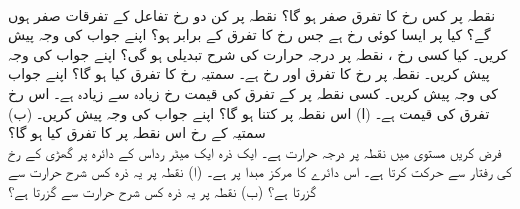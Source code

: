 \\
نقطہ  پر کس رخ  کا تفرق صفر ہو گا؟
نقطہ  پر کن دو رخ تفاعل  کے تفرقات  صفر ہوں گے؟
کیا  پر ایسا کوئی  رخ  ہے جس رخ   کا تفرق  کے برابر ہو؟ اپنے جواب کی وجہ پیش کریں۔
کیا کسی رخ ،  نقطہ  پر  درجہ حرارت     کی شرح تبدیلی  ہو گی؟ اپنے جواب کی وجہ پیش کریں۔
نقطہ  پر  رخ   کا تفرق   اور  رخ  ہے۔   سمتیہ   رخ  کا تفرق کیا ہو گا؟ اپنے جواب کی وجہ پیش کریں۔
کسی نقطہ پر  کے تفرق کی قیمت  رخ  زیادہ سے زیادہ ہے۔ اس رخ تفرق کی قیمت  ہے۔ (ا) اس نقطہ پر  کتنا ہو گا؟ اپنے جواب کی وجہ پیش کریں۔ (ب) سمتیہ    کے رخ  اس نقطہ پر   کا تفرق کیا ہو گا؟
\\
فرض کریں مستوی  میں  نقطہ   پر درجہ حرارت    ہے۔  ایک ذرہ  ایک میٹر رداس کے دائرہ پر  گھڑی کے رخ   کی  رفتار سے حرکت کرتا ہے۔ اس دائرے کا مرکز مبدا پر ہے۔ (ا)  نقطہ  پر یہ ذرہ  کس شرح حرارت    سے گزرتا ہے؟ (ب)     نقطہ  پر یہ ذرہ  کس شرح حرارت    سے گزرتا ہے؟ 
\\
